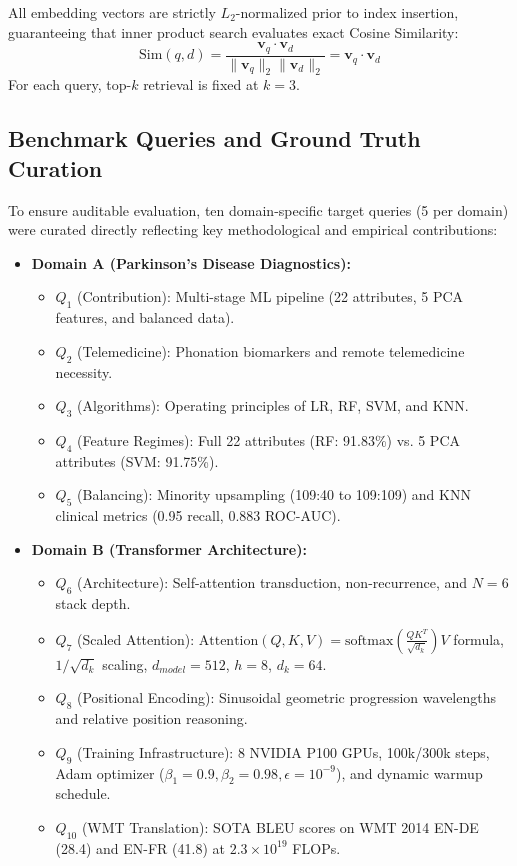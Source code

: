\documentclass[conference]{IEEEtran}
\begin{document}
All embedding vectors are strictly $L_2$-normalized prior to index insertion, guaranteeing that inner product search evaluates exact Cosine Similarity:
\begin{equation}
\text{Sim}(q, d) = \frac{\mathbf{v}_q \cdot \mathbf{v}_d}{\|\mathbf{v}_q\|_2 \|\mathbf{v}_d\|_2} = \mathbf{v}_q \cdot \mathbf{v}_d
\end{equation}
For each query, top-$k$ retrieval is fixed at $k=3$.

\subsection{Benchmark Queries and Ground Truth Curation}
To ensure auditable evaluation, ten domain-specific target queries (5 per domain) were curated directly reflecting key methodological and empirical contributions:
\begin{itemize}
    \item \textbf{Domain A (Parkinson's Disease Diagnostics):}
    \begin{itemize}
        \item $Q_1$ (Contribution): Multi-stage ML pipeline (22 attributes, 5 PCA features, and balanced data).
        \item $Q_2$ (Telemedicine): Phonation biomarkers and remote telemedicine necessity.
        \item $Q_3$ (Algorithms): Operating principles of LR, RF, SVM, and KNN.
        \item $Q_4$ (Feature Regimes): Full 22 attributes (RF: 91.83\%) vs. 5 PCA attributes (SVM: 91.75\%).
        \item $Q_5$ (Balancing): Minority upsampling (109:40 to 109:109) and KNN clinical metrics (0.95 recall, 0.883 ROC-AUC).
    \end{itemize}
    \item \textbf{Domain B (Transformer Architecture):}
    \begin{itemize}
        \item $Q_6$ (Architecture): Self-attention transduction, non-recurrence, and $N=6$ stack depth.
        \item $Q_7$ (Scaled Attention): $\text{Attention}(Q, K, V) = \text{softmax}\left(\frac{QK^T}{\sqrt{d_k}}\right)V$ formula, $1/\sqrt{d_k}$ scaling, $d_{model}=512$, $h=8$, $d_k=64$.
        \item $Q_8$ (Positional Encoding): Sinusoidal geometric progression wavelengths and relative position reasoning.
        \item $Q_9$ (Training Infrastructure): 8 NVIDIA P100 GPUs, 100k/300k steps, Adam optimizer ($\beta_1=0.9, \beta_2=0.98, \epsilon=10^{-9}$), and dynamic warmup schedule.
        \item $Q_{10}$ (WMT Translation): SOTA BLEU scores on WMT 2014 EN-DE (28.4) and EN-FR (41.8) at $2.3 \times 10^{19}$ FLOPs.
    \end{itemize}
\end{itemize}
\end{document}
